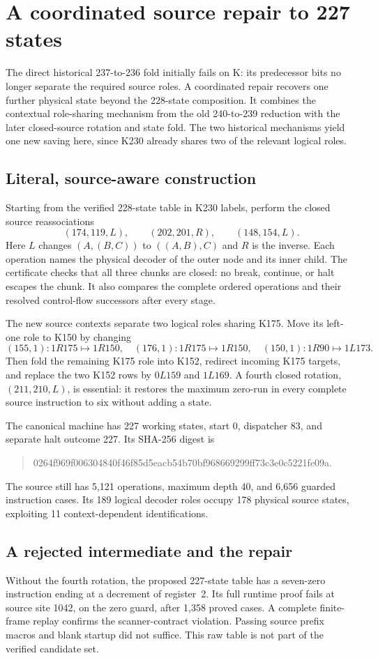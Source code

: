 \section{A coordinated source repair to 227 states}
The direct historical 237-to-236 fold initially fails on K: its predecessor
bits no longer separate the required source roles. A coordinated repair
recovers one further physical state beyond the 228-state composition.
It combines the contextual role-sharing mechanism from the old 240-to-239
reduction with the later closed-source rotation and state fold. The two
historical mechanisms yield one new saving here, since K230 already shares
two of the relevant logical roles.

\subsection{Literal, source-aware construction}
Starting from the verified 228-state table in K230 labels, perform the closed
source reassociations
\[
 (174,119,L),\qquad (202,201,R),\qquad (148,154,L).
\]
Here $L$ changes $(A,(B,C))$ to $((A,B),C)$ and $R$ is the inverse. Each
operation names the physical decoder of the outer node and its inner child.
The certificate checks that all three chunks are closed: no break, continue,
or halt escapes the chunk. It also compares the complete ordered operations
and their resolved control-flow successors after every stage.

The new source contexts separate two logical roles sharing K175. Move its
left-one role to K150 by changing
\[
 (155,1):1R175\mapsto1R150,\quad
 (176,1):1R175\mapsto1R150,\quad
 (150,1):1R90\mapsto1L173.
\]
Then fold the remaining K175 role into K152, redirect incoming K175 targets,
and replace the two K152 rows by $0L159$ and $1L169$.
A fourth closed rotation, $(211,210,L)$, is essential: it restores the maximum
zero-run in every complete source instruction to six without adding a state.

The canonical machine has 227 working states, start 0, dispatcher 83, and
separate halt outcome 227. Its SHA-256 digest is
\begin{quote}\ttfamily\small
0264f969f006304840f46f85d5eacb54b70bf968669299ff73c3e0c5221fe09a.
\end{quote}
The source still has 5,121 operations, maximum depth 40, and 6,656 guarded
instruction cases. Its 189 logical decoder roles occupy 178 physical source
states, exploiting 11 context-dependent identifications.

\subsection{A rejected intermediate and the repair}
Without the fourth rotation, the proposed 227-state table has a seven-zero
instruction ending at a decrement of register~2. Its full runtime proof fails
at source site 1042, on the zero guard, after 1,358 proved cases. A complete
finite-frame replay confirms the scanner-contract violation. Passing source
prefix macros and blank startup did not suffice. This raw table is not part
of the verified candidate set.


